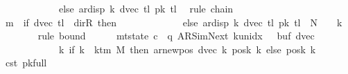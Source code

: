 \begin{isabellebody}
\ \ \ \ \ \ \ \ \ \ \ \ else\ ar{\isacharunderscore}{\kern0pt}disp\ {\isacharquery}{\kern0pt}k\ {\isacharparenleft}{\kern0pt}dvec\ {\isacharquery}{\kern0pt}tl{\isacharparenright}{\kern0pt}\ {\isacharparenleft}{\kern0pt}{\isacharquery}{\kern0pt}pk\ {\isacharquery}{\kern0pt}tl{\isacharparenright}{\kern0pt}{\isacharparenright}{\kern0pt}{\isacharparenright}{\kern0pt}{\isachardoublequoteclose}\ \isamarkupfalse%
\ {\isacharparenleft}{\kern0pt}rule\ chain{\isacharparenright}{\kern0pt}\isanewline
\ \ \ \ \isamarkupfalse%
\ {\isachardoublequoteopen}m{}\ {\isacharplus}{\kern0pt}\ {\isacharparenleft}{\kern0pt}if\ dvec\ {\isacharquery}{\kern0pt}tl\ {\isacharequal}{\kern0pt}\ dir{\isachardot}{\kern0pt}R\ then\ {}\isanewline
\ \ \ \ \ \ \ \ \ \ \ \ else\ ar{\isacharunderscore}{\kern0pt}disp\ {\isacharquery}{\kern0pt}k\ {\isacharparenleft}{\kern0pt}dvec\ {\isacharquery}{\kern0pt}tl{\isacharparenright}{\kern0pt}\ {\isacharparenleft}{\kern0pt}{\isacharquery}{\kern0pt}pk\ {\isacharquery}{\kern0pt}tl{\isacharparenright}{\kern0pt}{\isacharparenright}{\kern0pt}\ {\isasymle}\ {\isacharquery}{\kern0pt}N\ {\isacharasterisk}{\kern0pt}\ {\isacharparenleft}{\kern0pt}{}\ {\isacharasterisk}{\kern0pt}\ {\isacharquery}{\kern0pt}k{\isacharparenright}{\kern0pt}{\isachardoublequoteclose}\isanewline
\ \ \ \ \ \ \isamarkupfalse%
\ {\isacharparenleft}{\kern0pt}rule\ bound{\isacharparenright}{\kern0pt}\isanewline
\ \ \ \ \isamarkupfalse%
\ {\isachardoublequoteopen}mt{\isacharunderscore}{\kern0pt}state\ c{}\ {\isacharequal}{\kern0pt}\ {\isacharparenleft}{\kern0pt}q{\isacharcomma}{\kern0pt}\ AR{\isacharunderscore}{\kern0pt}SimNext{\isacharcomma}{\kern0pt}\ k{\isacharunderscore}{\kern0pt}unidx\ {}{\isacharcomma}{\kern0pt}\ {}{\isacharcomma}{\kern0pt}\ buf{}{\isacharcomma}{\kern0pt}\ dvec{\isacharcomma}{\kern0pt}\isanewline
\ \ \ \ \ \ \ \ \ \ \ \ {\isacharparenleft}{\kern0pt}{\isasymlambda}k{\isachardot}{\kern0pt}\ if\ k\ {\isacharless}{\kern0pt}\ k{\isacharunderscore}{\kern0pt}tm\ M\ then\ ar{\isacharunderscore}{\kern0pt}newpos\ {\isacharparenleft}{\kern0pt}dvec\ k{\isacharparenright}{\kern0pt}\ {\isacharparenleft}{\kern0pt}posk{}\ k{\isacharparenright}{\kern0pt}\ else\ posk{}\ k{\isacharparenright}{\kern0pt}{\isacharparenright}{\kern0pt}{\isachardoublequoteclose}\isanewline
\ \ \ \ \ \ \isamarkupfalse%
\ c{}{\isacharunderscore}{\kern0pt}st\ pk{\isacharunderscore}{\kern0pt}full\ \isamarkupfalse%

\end{isabellebody}
